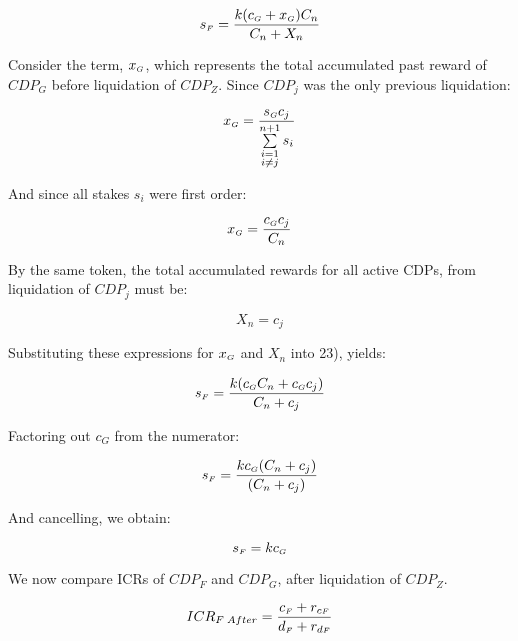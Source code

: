 \documentclass[reqno]{article}
\begin{document}
\begin{equation} 
    s_\mathsmaller{F}=\frac{k(c_\mathsmaller{G}+x_\mathsmaller{G})C_n}{C_n+X_n}
\end{equation}

\bigskip
Consider the term, $x_\mathsmaller{G}$, which represents the total accumulated past reward of $CDP_G$ before liquidation of $CDP_Z$.  Since $CDP_j$ was the only previous liquidation:

\begin{equation} 
    x_\mathsmaller{G}=\frac{s_\mathsmaller{G}c_j}{\sum\limits^{n+1}_{\substack{i=1\\i \ne j}}s_i}
\end{equation}

\bigskip
And since all stakes $s_i$ were first order:

\begin{equation} 
    x_\mathsmaller{G}=\frac{c_\mathsmaller{G}c_j}{C_n}
\end{equation}

\bigskip
By the same token, the total accumulated rewards for all active CDPs, from liquidation of $CDP_j$ must be:

\begin{equation} 
    X_n=c_j
\end{equation}

\bigskip
Substituting these expressions for $x_\mathsmaller{G}$ and $X_n$ into 23), yields:

\begin{equation} 
        s_\mathsmaller{F}=\frac{k(c_\mathsmaller{G}C_n+c_\mathsmaller{G}c_j)}{C_n+c_j}
\end{equation}

\bigskip
Factoring out $c_G$ from the numerator:

\begin{equation} 
    s_\mathsmaller{F}=\frac{k c_\mathsmaller{G}(C_n+c_j)}{(C_n+c_j)}
\end{equation}

\bigskip
And cancelling, we obtain:

\begin{equation} 
    s_\mathsmaller{F}=kc_\mathsmaller{G}
\end{equation}

\bigskip
We now compare ICRs of $CDP_F$ and $CDP_G$, after liquidation of $CDP_Z$.

\begin{equation} 
    ICR_{F \; After}=\frac{c_\mathsmaller{F}+r_{c\mathsmaller{F}}}{d_\mathsmaller{F}+r_{d\mathsmaller{F}}}
\end{equation}
\end{document}
